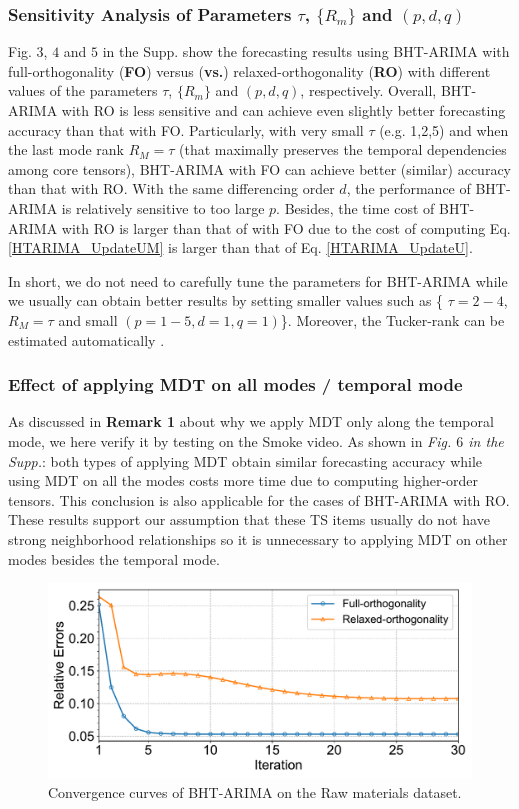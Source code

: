 \documentclass[letterpaper]{article} %
\numberwithin{theorem}{section}
\begin{document}
\subsubsection {Sensitivity Analysis of Parameters $\tau$, $\{R_m\}$ and  $(p,d,q)$}
Fig. $3$, $4$ and $5$ in the  Supp. show the forecasting results  using  BHT-ARIMA with  {full-orthogonality (\textbf{FO}) }  versus (\textbf{vs.})  {relaxed-orthogonality (\textbf{RO})}  with   different values of the  parameters  $\tau$, $\{R_m\}$ and  $(p,d,q)$, respectively.  Overall,   BHT-ARIMA with  RO is less sensitive and can achieve even slightly better forecasting accuracy than that  with FO.  Particularly, with   very small  $\tau$  (e.g. 1,2,5) and  when  the last mode rank $R_M =\tau $ (that maximally preserves the temporal dependencies among  core tensors),  BHT-ARIMA with  FO can achieve better  (similar) accuracy than that with RO.  With the same differencing  order $d$, the performance of BHT-ARIMA is relatively sensitive to too large $p$. Besides, the time cost of  BHT-ARIMA with RO is larger than   that of with FO  due to the cost of computing Eq.  \eqref{HTARIMA_UpdateUM} is larger than that of Eq.  \eqref{HTARIMA_UpdateU}.  

In short,    we do not need to carefully tune the parameters for BHT-ARIMA  while we usually  can obtain better results by  setting  smaller values such as  \{ $\tau = {2-4}$,   $R_M =\tau $ and small  $(p={1-5}, d={1},q={1})$\}.   Moreover,  the Tucker-rank can be estimated automatically \cite{yokota2016robust,shi2017tensor}.            

\subsubsection {Effect of  applying MDT on all modes /  temporal mode}
As discussed in \textbf{Remark 1} about why we apply MDT only along the temporal mode,  we here  verify it by testing on the Smoke video. As shown in  \textit{Fig. $6$ in the Supp.}: both types of applying MDT obtain similar forecasting accuracy while   using MDT on all the modes costs more time due to computing higher-order tensors.   This conclusion is also  applicable for the cases of  BHT-ARIMA with RO. These results support our assumption that  these TS items usually do not have strong neighborhood relationships   so it is unnecessary to applying MDT on other modes besides the temporal  mode.  
\begin{figure} [ttt!]
	\centering
\includegraphics[width=0.85\columnwidth]{Fig3_Convergence_curves.pdf} 	
\caption{\label{Convergence}Convergence curves  of BHT-ARIMA on   the Raw materials dataset.}
\end{figure}
\end{document}
